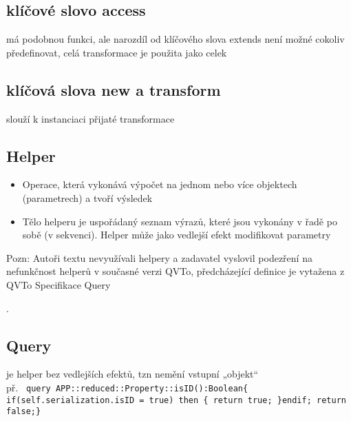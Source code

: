 \documentclass[11pt,a4paper]{article}   	%
\begin{document}
\begin{itemize}
\subsection { klíčové slovo access }
má podobnou funkci, ale narozdíl od klíčového slova extends není možné cokoliv
předefinovat, celá transformace je použita jako celek

\subsection {klíčová slova new a transform}
 slouží k instanciaci přijaté transformace

\subsection {Helper}
\begin {itemize}
  	\item	Operace, která vykonává výpočet na jednom nebo více objektech
			(parametrech) a tvoří výsledek
	\item	Tělo helperu je uspořádaný seznam výrazů, které jsou vykonány v řadě po
			sobě (v sekvenci). Helper může jako vedlejší efekt modifikovat parametry
\end{itemize}
Pozn: Autoři textu nevyužívali helpery a zadavatel vyslovil podezření na nefunkčnost helperů v současné verzi QVTo, předcházející definice je vytažena z QVTo Specifikace Query \end{itemize}. 

\subsection{Query }
je helper bez vedlejších efektů, tzn nemění vstupní „objekt“\\
př. \texttt {
				query APP::reduced::Property::isID():Boolean\{
		if(self.serialization.isID = true) then \{ return true; \}endif; return
		false;\} }

\end{document}
